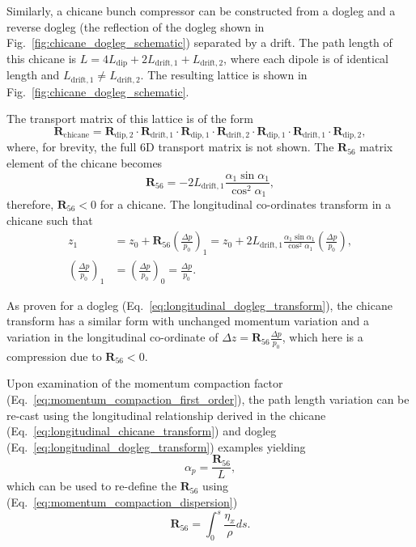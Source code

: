 \documentclass[../main.tex]{subfiles}
\begin{document}
Similarly, a chicane bunch compressor can be constructed from a dogleg and a reverse dogleg (the reflection of the dogleg shown in Fig.~\ref{fig:chicane_dogleg_schematic}) separated by a drift. The path length of this chicane is $L = 4L_{\mathrm{dip}}+2L_{\mathrm{drift,1}}+L_{\mathrm{drift,2}}$, where each dipole is of identical length and $L_{\mathrm{drift,1}}\neq L_{\mathrm{drift,2}}$. The resulting lattice is shown in Fig.~\ref{fig:chicane_dogleg_schematic}. 

The transport matrix of this lattice is of the form
\begin{equation}
\boldsymbol{R}_{\mathrm{chicane}} = \boldsymbol{R}_{\mathrm{dip,2}}\cdot\boldsymbol{R}_{\mathrm{drift,1}}\cdot\boldsymbol{R}_{\mathrm{dip,1}}\cdot\boldsymbol{R}_{\mathrm{drift,2}}\cdot\boldsymbol{R}_{\mathrm{dip,1}}\cdot\boldsymbol{R}_{\mathrm{drift,1}}\cdot\boldsymbol{R}_{\mathrm{dip,2}},
\label{eq:chicane_transport_matrix}    
\end{equation}
where, for brevity, the full 6D transport matrix is not shown. The $\boldsymbol{R}_{56}$ matrix element of the chicane becomes
\begin{equation}
\boldsymbol{R}_{56} = -2L_{\mathrm{drift,1}}\frac{\alpha_{1}\sin\alpha_{1}}{\cos^{2}\alpha_{1}},
\label{eq:chicane_R56}    
\end{equation}
therefore, $\boldsymbol{R}_{56}<0$ for a chicane. The longitudinal co-ordinates transform in a chicane such that
\begin{align}
z_{1} &= z_{0} + \boldsymbol{R}_{56}\left(\frac{\Delta p}{p_{0}}\right)_{1} = z_{0} + 2L_{\mathrm{drift,1}}\frac{\alpha_{1}\sin\alpha_{1}}{\cos^{2}\alpha_{1}}\left(\frac{\Delta p}{p_{0}}\right), \\
\left(\frac{\Delta p}{p_{0}}\right)_{1} &= \left(\frac{\Delta p}{p_{0}}\right)_{0} = \frac{\Delta p}{p_{0}}. 
\label{eq:longitudinal_chicane_transform}    
\end{align}

As proven for a dogleg (Eq.~\ref{eq:longitudinal_dogleg_transform}), the chicane transform has a similar form with unchanged momentum variation and a variation in the longitudinal co-ordinate of $\Delta z = \boldsymbol{R}_{56}\frac{\Delta p}{p_{0}}$, which here is a compression due to $\boldsymbol{R}_{56}<0$.

Upon examination of the momentum compaction factor (Eq.~\ref{eq:momentum_compaction_first_order}), the path length variation can be re-cast using the longitudinal relationship \cite{wolski2012longitudinal} derived in the chicane (Eq.~\ref{eq:longitudinal_chicane_transform}) and dogleg (Eq.~\ref{eq:longitudinal_dogleg_transform}) examples yielding 
\begin{equation}
\alpha_{p} = \frac{\boldsymbol{R}_{56}}{L},
\label{eq:momentum_compaction_R56}
\end{equation}
which can be used to re-define the $\boldsymbol{R}_{56}$ using (Eq.~\ref{eq:momentum_compaction_dispersion})
\begin{equation}
\boldsymbol{R}_{56} = \int_{0}^{s}\frac{\eta_{x}}{\rho}ds.    
\label{eq:R56_dispersion_relation}
\end{equation}
\end{document}
